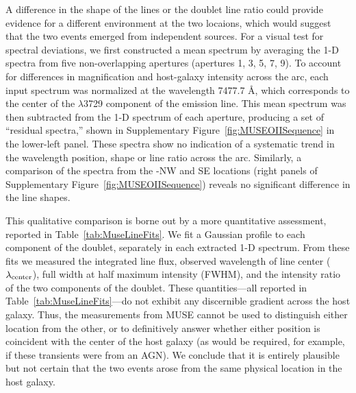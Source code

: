 A difference in the shape of the  lines or the
doublet line ratio could provide evidence for a different environment
at the two \spock locaions, which would suggest that the two events
emerged from independent sources.  For a visual test for spectral
deviations, we first constructed a mean spectrum by averaging the 1-D
spectra from five non-overlapping apertures (apertures 1, 3, 5, 7,
9). To account for differences in magnification and host-galaxy
intensity across the arc, each input spectrum was normalized at the
wavelength 7477.7 \AA, which corresponds to the center of the
$\lambda$3729 component of the  emission line.  This
mean spectrum was then subtracted from the 1-D spectrum of each
aperture, producing a set of ``residual spectra,'' shown in
Supplementary Figure~\ref{fig:MUSEOIISequence} in the lower-left panel.  These
spectra show no indication of a systematic trend in the wavelength
position, shape or line ratio across the arc.  Similarly, a comparison
of the spectra from the \spock-NW and SE locations (right panels of
Supplementary Figure~\ref{fig:MUSEOIISequence}) reveals no significant difference in
the  line shapes.

This qualitative comparison is borne out by a more quantitative
assessment, reported in Table~\ref{tab:MuseLineFits}. We fit a
Gaussian profile to each component of the  doublet,
separately in each extracted 1-D spectrum. From these fits we measured
the integrated line flux, observed wavelength of line center
($\lambda_{\rm center}$), full width at half maximum intensity (FWHM), and the
intensity ratio of the two components of the doublet.  These
quantities---all reported in Table~\ref{tab:MuseLineFits}---do not
exhibit any discernible gradient across the host galaxy.  Thus, the
 measurements from MUSE cannot be used to distinguish
either \spock location from the other, or to definitively answer
whether either position is coincident with the center of the host
galaxy (as would be required, for example, if these transients were
from an AGN).  We conclude that it is entirely plausible but not
certain that the two \spock events arose from the same physical
location in the host galaxy.

